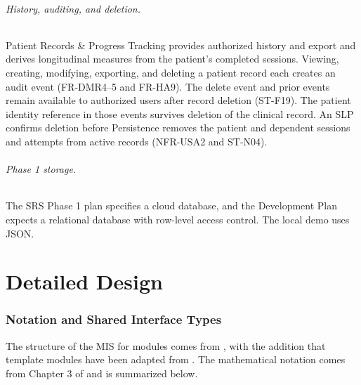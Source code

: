 \documentclass[12pt, titlepage]{article}
\begin{document}
\paragraph{History, auditing, and deletion.}
Patient Records \& Progress Tracking provides authorized history and export
and derives longitudinal measures from the patient's completed sessions.
Viewing, creating, modifying, exporting, and deleting a patient record each
creates an audit event (FR-DMR4--5 and FR-HA9). The delete event and prior
events remain available to authorized users after record deletion (ST-F19).
The patient identity reference in those events survives deletion of the
clinical record. An SLP confirms deletion before Persistence removes the
patient and dependent sessions and attempts from active records
(NFR-USA2 and ST-N04).

\paragraph{Phase 1 storage.}
The SRS Phase 1 plan specifies a cloud database, and the Development Plan
expects a relational database with row-level access control. The local demo
uses JSON.

\clearpage

\part{Detailed Design} \label{part:detailed}

\section{Notation and Shared Interface Types}

The structure of the MIS for modules comes from \citet{HoffmanAndStrooper1995},
with the addition that template modules have been adapted from
\cite{GhezziEtAl2003}.  The mathematical notation comes from Chapter 3 of
\citet{HoffmanAndStrooper1995} and is summarized below.
\end{document}
